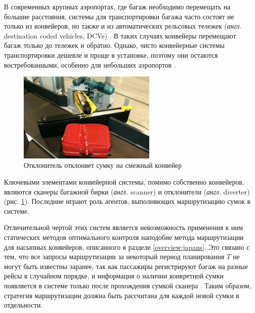 \documentclass[specification,annotation,times]{itmo-student-thesis}
\theoremstyle{definition}
\begin{document}
В современных крупных аэропортах, где багаж необходимо перемещать на большие
расстояния, системы для транспортировки багажа часто состоят не только из
конвейеров, но также и из автоматических рельсовых тележек (\textit{англ.}
destination coded vehicles, DCVs) \cite{fay2005decentralized, tarau2010model}.
В таких случаях конвейеры перемещают багаж только до тележек и обратно. Однако,
чисто конвейерные системы транспортировки дешевле и проще в установке, поэтому
они остаются востребованными, особенно для небольших аэропортов
\cite{vickers1998passenger}.

\begin{figure}[!h]
  \caption{Отклонитель отклоняет сумку на смежный конвейер}\label{diverter-pic}
  \centering
  \includegraphics[width=0.6\textwidth]{diverter-photo}
\end{figure}

Ключевыми элементами конвейерной системы, помимо собственно конвейеров, являются
сканеры багажной бирки (\textit{англ.} scanner) и отклонители (\textit{англ.}
diverter) (рис. \ref{diverter-pic}). Последние играют роль агентов, выполняющих
маршрутизацию сумок в системе.

Отличительной чертой этих систем является невозможность применения к ним
статических методов оптимального контроля наподобие метода маршрутизации для
насыпных конвейеров, описанного в разделе \ref{overview:japans}. Это связано с
тем, что все запросы маршрутизации за некоторый период планирования $T$ не могут
быть известны заранее, так как
пассажиры регистрируют багаж на разные рейсы в случайном порядке, и информация о
наличии конкретной сумки появляется в системе только после прохождения сумкой
сканера \cite{hallenborg2007decentralized, de1994baggage}. Таким образом,
стратегия маршрутизации должна быть рассчитана для каждой новой сумки в
отдельности.
\end{document}
